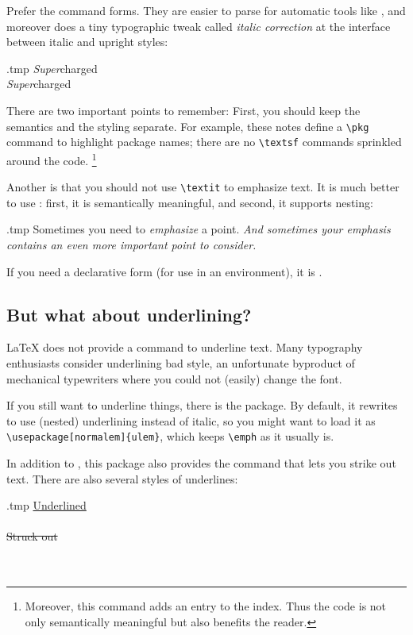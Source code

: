 \begin{technote}
Prefer the command forms.
They are easier to parse for automatic tools like ,
and moreover  does a tiny typographic tweak called \emph{italic correction}
at the interface between italic and upright styles:
%
\begin{VerbatimOut}{\jobname.tmp}
\textit{Super}charged\\
{\itshape Super}charged
\end{VerbatimOut}
\ShowExample
\end{technote}

There are two important points to remember:
First, you should keep the semantics and the styling separate.
For example, these notes define a \verb|\pkg| command to highlight package names;
there are no \verb|\textsf| commands sprinkled around the code.%
\footnote{Moreover, this command adds an entry to the index.
Thus the code is not only semantically meaningful but also benefits the reader.}

Another is that you should not use \verb|\textit| to emphasize text.
It is much better to use :
first, it is semantically meaningful, and second, it supports nesting:
%
\begin{VerbatimOut}{\jobname.tmp}
Sometimes you need to
\emph{emphasize} a point.
\emph{And sometimes your emphasis
contains \emph{an even more important}
point to consider.}
\end{VerbatimOut}
\ShowExample
%
If you need a declarative form (for use in an environment), it is .


\subsection{But what about underlining?}

\LaTeX{} does not provide a command to underline text.
Many typography enthusiasts consider underlining bad style,
an unfortunate byproduct of mechanical typewriters where you could not (easily) change the font.

If you still want to underline things, there is the  package.
By default, it rewrites  to use (nested) underlining instead of italic,
so you might want to load it as \verb|\usepackage[normalem]{ulem}|,
which keeps \verb|\emph| as it usually is.

In addition to , this package also provides the  command
that lets you strike out text.
There are also several styles of underlines:
%
\begin{VerbatimOut}{\jobname.tmp}
\uline{Underlined}\\
\\
\sout{Struck out}\\
\\
\\
\end{VerbatimOut}
\ShowExample


